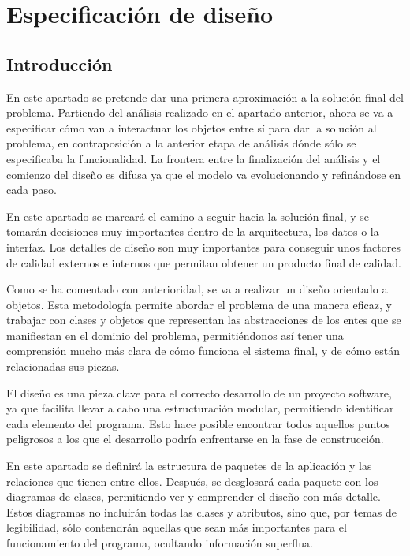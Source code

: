 \chapter{Especificación de diseño}


\section{Introducción}

En este apartado se pretende dar una primera aproximación a la solución final del problema. Partiendo del análisis realizado en el apartado anterior, ahora se va a especificar cómo van a interactuar los objetos entre sí para dar la solución al problema, en contraposición a la anterior etapa de análisis dónde sólo se especificaba la funcionalidad. La frontera entre la finalización del análisis y el comienzo del diseño es difusa ya que el modelo va evolucionando y refinándose en cada paso.

En este apartado se marcará el camino a seguir hacia la solución final, y se tomarán decisiones muy importantes dentro de la arquitectura, los datos o la interfaz. Los detalles de diseño son muy importantes para conseguir unos factores de calidad externos e internos que permitan obtener un producto final de calidad.

Como se ha comentado con anterioridad, se va a realizar un diseño orientado a objetos. Esta metodología permite abordar el problema de una manera eficaz, y trabajar con clases y objetos que representan las abstracciones de los entes que se manifiestan en el dominio del problema, permitiéndonos así tener una comprensión mucho más clara de cómo funciona el sistema final, y de cómo están relacionadas sus piezas.

El diseño es una pieza clave para el correcto desarrollo de un proyecto software, ya que facilita llevar a cabo una estructuración modular, permitiendo identificar cada elemento del programa. Esto hace posible encontrar todos aquellos puntos peligrosos a los que el desarrollo podría enfrentarse en la fase de construcción.

En este apartado se definirá la estructura de paquetes de la aplicación y las relaciones que tienen entre ellos. Después, se desglosará cada paquete con los diagramas de clases, permitiendo ver y comprender el diseño con más detalle. Estos diagramas no incluirán todas las clases y atributos, sino que, por temas de legibilidad, sólo contendrán aquellas que sean más importantes para el funcionamiento del programa, ocultando información superflua.


